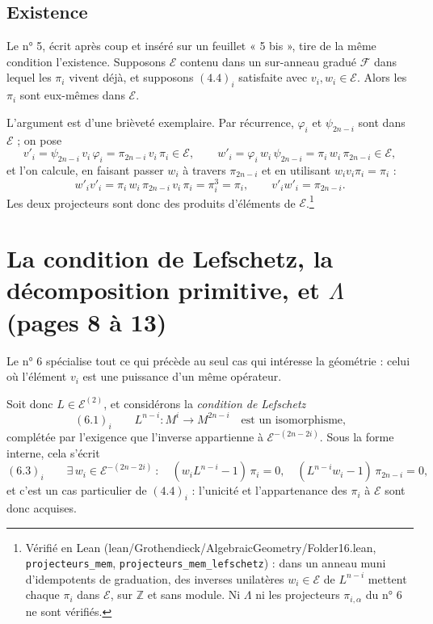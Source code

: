 \documentclass[11pt,a4paper]{article}
\begin{document}
\subsection*{Existence}

Le n° 5, écrit après coup et inséré sur un feuillet « 5 bis », tire de la même
condition l'existence. Supposons $\mathcal{E}$ contenu dans un sur-anneau
gradué $\mathcal{F}$ dans lequel les $\pi_{i}$ vivent déjà, et supposons
$(4.4)_{i}$ satisfaite avec $v_{i}, w_{i} \in \mathcal{E}$. Alors les
$\pi_{i}$ sont eux-mêmes dans $\mathcal{E}$.

L'argument est d'une brièveté exemplaire. Par récurrence, $\varphi_{i}$ et
$\psi_{2n-i}$ sont dans $\mathcal{E}$ ; on pose
\[
v'_{i} = \psi_{2n-i}\,v_{i}\,\varphi_{i} = \pi_{2n-i}\,v_{i}\,\pi_{i} \in \mathcal{E},
\qquad
w'_{i} = \varphi_{i}\,w_{i}\,\psi_{2n-i} = \pi_{i}\,w_{i}\,\pi_{2n-i} \in \mathcal{E},
\]
et l'on calcule, en faisant passer $w_{i}$ à travers $\pi_{2n-i}$ et en
utilisant $w_{i}v_{i}\pi_{i} = \pi_{i}$ :
\[
w'_{i}v'_{i} = \pi_{i}\,w_{i}\,\pi_{2n-i}\,v_{i}\,\pi_{i} = \pi_{i}^{3} = \pi_{i},
\qquad v'_{i}w'_{i} = \pi_{2n-i} .
\]
Les deux projecteurs sont donc des produits d'éléments de $\mathcal{E}$.\footnote{Vérifié en Lean
(lean/Grothendieck/AlgebraicGeometry/Folder16.lean, \texttt{projecteurs\_mem},
\texttt{projecteurs\_mem\_lefschetz}) : dans un anneau muni d'idempotents de
graduation, des inverses unilatères $w_{i} \in \mathcal{E}$ de $L^{n-i}$
mettent chaque $\pi_{i}$ dans $\mathcal{E}$, sur $\mathbb{Z}$ et sans module.
Ni $\Lambda$ ni les projecteurs $\pi_{i,\alpha}$ du n° 6 ne sont vérifiés.}

\section*{La condition de Lefschetz, la décomposition primitive, et $\Lambda$ (pages 8 à 13)}

Le n° 6 spécialise tout ce qui précède au seul cas qui intéresse la géométrie :
celui où l'élément $v_{i}$ est une puissance d'un même opérateur.

Soit donc $L \in \mathcal{E}^{(2)}$, et considérons la
\emph{condition de Lefschetz}
\[
(6.1)_{i} \qquad L^{n-i} \colon M^{i} \longrightarrow M^{2n-i}
\quad\text{est un isomorphisme,}
\]
complétée par l'exigence que l'inverse appartienne à
$\mathcal{E}^{-(2n-2i)}$. Sous la forme interne, cela s'écrit
\[
(6.3)_{i} \qquad
\exists\, w_{i} \in \mathcal{E}^{-(2n-2i)} \ :\quad
(w_{i}L^{n-i} - 1)\,\pi_{i} = 0, \quad (L^{n-i}w_{i} - 1)\,\pi_{2n-i} = 0,
\]
et c'est un cas particulier de $(4.4)_{i}$ : l'unicité et l'appartenance des
$\pi_{i}$ à $\mathcal{E}$ sont donc acquises.
\end{document}
